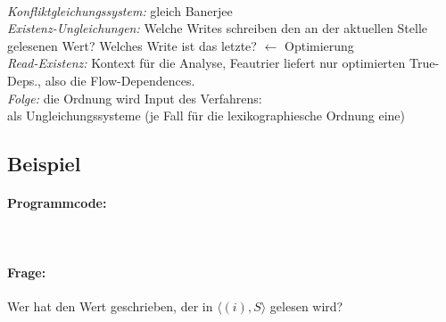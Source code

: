 
~\\[0.5cm]
\emph{Konfliktgleichungssystem:} gleich Banerjee\\[0.2cm]
\emph{Existenz-Ungleichungen:} Welche \glqq Writes \grqq schreiben den an der aktuellen Stelle gelesenen Wert? Welches \glqq Write \grqq ist das letzte? $\leftarrow$ Optimierung\\[0.2cm]
\emph{Read-Existenz:} Kontext für die Analyse, Feautrier liefert nur optimierten True-Deps., also die Flow-Dependences.\\[0.2cm]
\emph{Folge:} die Ordnung wird Input des Verfahrens:\\
als Ungleichungssysteme (je Fall für die lexikographiesche Ordnung eine)


\subsection{Beispiel}

\paragraph{Programmcode:}~\\
\begin{procedure}[H]
\SetAlgoLined
{}
\end{procedure}

\paragraph{Frage:} Wer hat den Wert geschrieben, der in $\langle (i),S \rangle$ gelesen wird?\\


